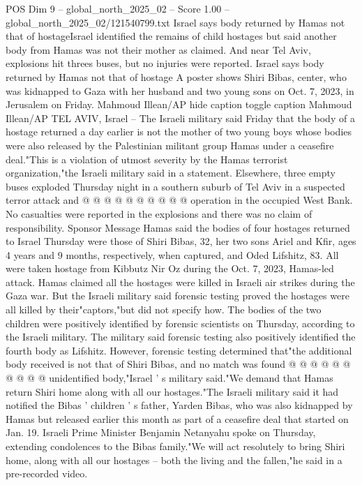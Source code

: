 \begin{textsample}{POS Dim 9 – global\_north\_2025\_02 – Score 1.00 – global\_north\_2025\_02/121540799.txt}  \label{ex:f9_pos_445}
Israel says body returned by Hamas not that of hostageIsrael identified the remains of child hostages but said another body from Hamas was not their mother as claimed.
And near Tel Aviv, explosions hit threes buses, but no injuries were reported.
Israel says body returned by Hamas not that of hostage A poster shows Shiri Bibas, center, who was kidnapped to Gaza with her husband and two young sons on Oct. 7, 2023, in Jerusalem on Friday.
Mahmoud Illean/AP hide caption toggle caption Mahmoud Illean/AP TEL AVIV, Israel -- The Israeli military said Friday that the body of a hostage returned a day earlier is not the mother of two young boys whose bodies were also released by the Palestinian militant group Hamas under a ceasefire deal."This is a violation of utmost severity by the Hamas terrorist organization,"the Israeli military said in a statement.
Elsewhere, three empty buses exploded Thursday night in a southern suburb of Tel Aviv in a suspected terror attack and @ @ @ @ @ @ @ @ @ @ operation in the occupied West Bank.
No casualties were reported in the explosions and there was no claim of responsibility.
Sponsor Message Hamas said the bodies of four hostages returned to Israel Thursday were those of Shiri Bibas, 32, her two sons Ariel and Kfir, ages 4 years and 9 months, respectively, when captured, and Oded Lifshitz, 83.
All were taken hostage from Kibbutz Nir Oz during the Oct. 7, 2023, Hamas-led attack.
Hamas claimed all the hostages were killed in Israeli air strikes during the Gaza war.
But the Israeli military said forensic testing proved the hostages were all killed by their"captors,"but did not specify how.
The bodies of the two children were positively identified by forensic scientists on Thursday, according to the Israeli military.
The military said forensic testing also positively identified the fourth body as Lifshitz.
However, forensic testing determined that"the additional body received is not that of Shiri Bibas, and no match was found @ @ @ @ @ @ @ @ @ @ unidentified body,"Israel ' s military said."We demand that Hamas return Shiri home along with all our hostages."The Israeli military said it had notified the Bibas ' children ' s father, Yarden Bibas, who was also kidnapped by Hamas but released earlier this month as part of a ceasefire deal that started on Jan. 19.
Israeli Prime Minister Benjamin Netanyahu spoke on Thursday, extending condolences to the Bibas family."We will act resolutely to bring Shiri home, along with all our hostages -- both the living and the fallen,"he said in a pre-recorded video.

\end{textsample}
